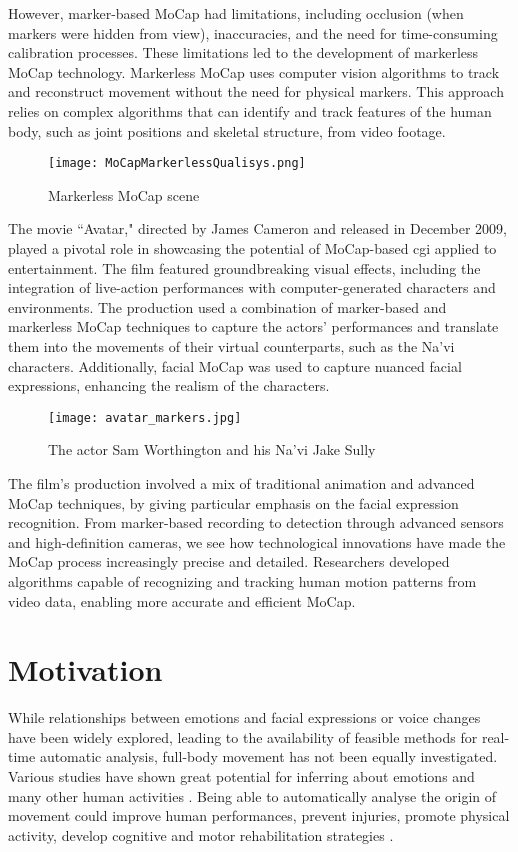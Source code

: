 However, marker-based MoCap had limitations, including occlusion 
(when markers were hidden from view), inaccuracies, and the need for time-consuming calibration processes. 
These limitations led to the development of markerless MoCap technology. 
Markerless MoCap uses computer vision algorithms to track and reconstruct movement without the need for physical markers. 
This approach relies on complex algorithms that can identify and track features of the human body, 
such as joint positions and skeletal structure, from video footage.
\begin{figure}[H]
    \centering
    \texttt{[image: MoCapMarkerlessQualisys.png]}
    \caption{Markerless MoCap scene}
    \label{fig:mocap}
\end{figure}

The movie “Avatar," directed by James Cameron and released in December 2009, 
played a pivotal role in showcasing the potential of MoCap-based cgi applied to entertainment. 
The film featured groundbreaking visual effects, 
including the integration of live-action performances with computer-generated characters and environments. 
The production used a combination of marker-based and markerless MoCap techniques to capture the actors' 
performances and translate them into the movements of their virtual counterparts, such as the Na'vi characters.
Additionally, facial MoCap was used to capture nuanced facial expressions, enhancing the realism of the characters.
\begin{figure}[H]
    \centering
    \texttt{[image: avatar\_markers.jpg]}
    \caption[]{The actor Sam Worthington and his Na'vi Jake Sully}
    \label{fig:avatar}
\end{figure}

The film's production involved a mix of traditional animation and advanced MoCap techniques, by giving particular emphasis on the facial expression recognition.
From marker-based recording to detection through advanced sensors and high-definition cameras, we see how technological innovations have made the MoCap process increasingly precise and detailed.
Researchers developed algorithms capable of recognizing and tracking human motion patterns from video data, 
enabling more accurate and efficient MoCap.

\section{Motivation}
While relationships between emotions and facial expressions or voice changes have been widely explored, 
leading to the availability of feasible methods for real-time automatic analysis, 
full-body movement has not been equally investigated. 
Various studies have shown great potential for inferring about emotions and many other human activities \cite{Bachmann:2020, preiler:2023}. 
Being able to automatically analyse the origin of movement could improve human performances, 
prevent injuries, promote physical activity, develop cognitive and motor rehabilitation strategies \cite{piana:2016}. 

